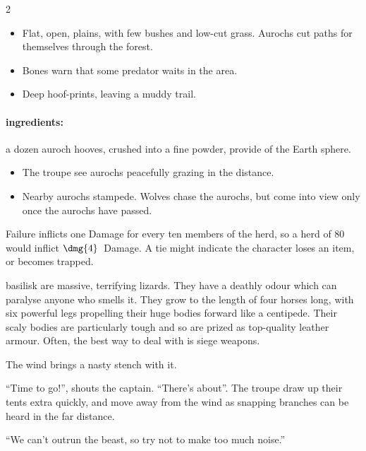 \begin{multicols}{2}
\begin{itemize}
  \item
  Flat, open, plains, with few bushes and low-cut grass.
  Aurochs cut paths for themselves through the forest.
  \item
  Bones warn that some predator waits in the area.
  \item
  Deep hoof-prints, leaving a muddy trail.
\end{itemize}

\paragraph{\Glspl{ingredient}:}
a dozen auroch hooves, crushed into a fine powder, provide  of the Earth \gls{sphere}.

\showEnc

\begin{itemize}
  \item
  The troupe see aurochs peacefully grazing in the distance.
  \item
  Nearby aurochs stampede.
  Wolves chase the aurochs, but come into view only once the aurochs have passed.
\end{itemize}

Failure inflicts one Damage for every ten members of the herd, so a herd of 80 would inflict $\dmg{4}$~Damage.
A tie might indicate the character loses an item, or becomes trapped.

  {basilisk}%
are massive, terrifying lizards.
They have a deathly odour which can paralyse anyone who smells it.
They grow to the length of four horses long, with six powerful legs propelling their huge bodies forward like a centipede.
Their scaly bodies are particularly tough and so are prized as top-quality leather armour.
Often, the best way to deal with  is siege weapons.

\begin{boxtext}
  The wind brings a nasty stench with it.

  ``Time to go!'', shouts the captain.
  ``There's  about''.
  The troupe draw up their tents extra quickly, and move away from the wind as snapping branches can be heard in the far distance.

  ``We can't outrun the beast, so try not to make too much noise.''
\end{boxtext}


\end{multicols}
